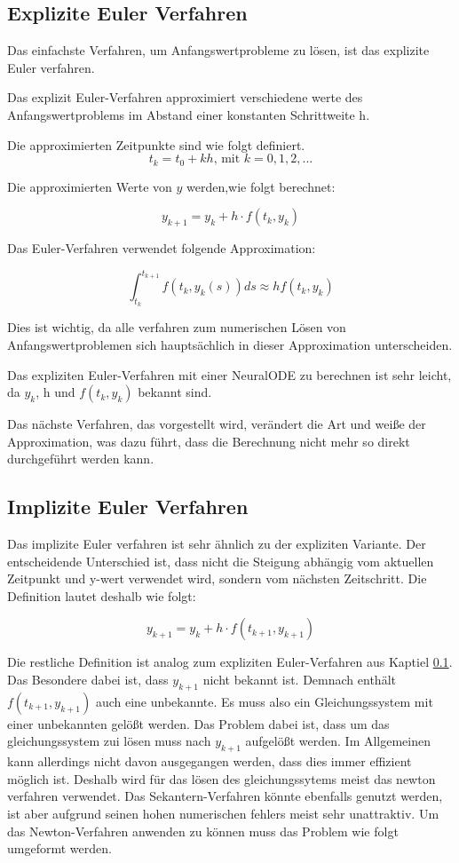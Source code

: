 \subsection{Explizite Euler Verfahren} \label{sec:explizites_euler_verfahren}


Das einfachste Verfahren, um Anfangswertprobleme zu lösen, ist das explizite Euler verfahren.

Das explizit Euler-Verfahren approximiert verschiedene werte des Anfangswertproblems 
im Abstand einer konstanten Schrittweite h.

Die approximierten Zeitpunkte sind wie folgt definiert.
$$
t_k = t_0 + kh \text{, mit } k = 0, 1, 2, ...
$$

Die approximierten Werte von $y$ werden,wie folgt berechnet:

$$
y_{k + 1} = y_{k} + h \cdot f(t_k, y_k)
$$

Das Euler-Verfahren verwendet folgende Approximation:

$$
\int_{t_k}^{t_{k+1}} f(t_k, y_k(s)) ds \approx h f(t_k, y_k)
$$

Dies ist wichtig, da alle verfahren zum numerischen Lösen von Anfangswertproblemen sich hauptsächlich in dieser Approximation unterscheiden.

Das expliziten Euler-Verfahren mit einer NeuralODE  zu berechnen
ist sehr leicht, da $y_k$, h und $f(t_k, y_k)$ bekannt sind.

Das nächste Verfahren, das vorgestellt wird, verändert die Art und weiße der Approximation, was dazu führt, dass die Berechnung nicht mehr so direkt durchgeführt werden kann.

\subsection{Implizite Euler Verfahren}

Das implizite Euler verfahren ist sehr ähnlich zu der expliziten Variante.
Der entscheidende Unterschied ist, dass nicht die Steigung abhängig vom aktuellen 
Zeitpunkt und y-wert verwendet wird, sondern vom nächsten Zeitschritt.
Die Definition lautet deshalb wie folgt:

$$
y_{k + 1} = y_k + h \cdot f(t_{k + 1}, y_{k + 1})
$$

Die restliche Definition ist analog zum expliziten Euler-Verfahren aus Kaptiel \ref{sec:explizites_euler_verfahren}.
Das Besondere dabei ist, dass $y_{k + 1}$ nicht bekannt ist.
Demnach enthält $f(t_{k + 1}, y_{k + 1})$ auch eine unbekannte.
Es muss also ein Gleichungssystem mit einer unbekannten gelößt werden.
Das Problem dabei ist, dass um das gleichungssystem zui lösen muss nach $y_{k + 1}$ aufgelößt werden.
Im Allgemeinen kann allerdings nicht davon ausgegangen werden, dass dies immer effizient möglich ist.
Deshalb wird für das lösen des gleichungssytems meist das newton verfahren verwendet.
Das Sekantern-Verfahren könnte ebenfalls genutzt werden, ist aber aufgrund seinen hohen numerischen 
fehlers meist sehr unattraktiv.
Um das Newton-Verfahren anwenden zu können muss das Problem wie folgt umgeformt werden.

